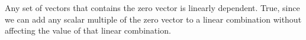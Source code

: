 {Any set of vectors that contains the zero vector is linearly dependent.}
{True, since we can add any scalar multiple of the zero vector to a linear combination without affecting the value of that linear combination.}